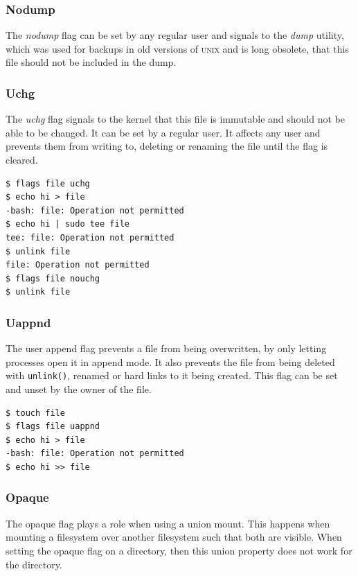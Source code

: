\documentclass[a4paper]{article}
\begin{document}

\subsubsection{Nodump}

The \emph{nodump} flag can be set by any regular user and signals to the \emph{dump} utility, which was used for backups in old versions of \textsc{unix} and is long obsolete, that this file should not be included in the dump.

\subsubsection{Uchg}

The \emph{uchg} flag signals to the kernel that this file is immutable and should not be able to be changed. It can be set by a regular user. It affects any user and prevents them from writing to, deleting or renaming the file until the flag is cleared.

\begin{verbatim}
$ flags file uchg
$ echo hi > file
-bash: file: Operation not permitted
$ echo hi | sudo tee file
tee: file: Operation not permitted
$ unlink file
file: Operation not permitted
$ flags file nouchg
$ unlink file
\end{verbatim}

\subsubsection{Uappnd}

The user append flag prevents a file from being overwritten, by only letting processes open it in append mode. It also prevents the file from being deleted with \verb|unlink()|, renamed or hard links to it being created. This flag can be set and unset by the owner of the file.

\begin{verbatim}
$ touch file
$ flags file uappnd
$ echo hi > file
-bash: file: Operation not permitted
$ echo hi >> file
\end{verbatim}

\subsubsection{Opaque}

The opaque flag plays a role when using a union mount. This happens when mounting a filesystem over another filesystem such that both are visible. When setting the opaque flag on a directory, then this union property does not work for the directory.
\end{document}
